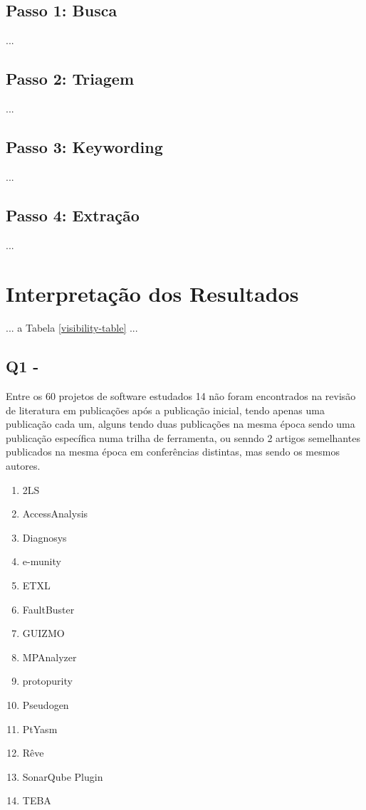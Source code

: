 \subsection{Passo 1: Busca}

...

\subsection{Passo 2: Triagem}

...

\subsection{Passo 3: Keywording}

...

\subsection{Passo 4: Extração}

...


\section{Interpretação dos Resultados} \label{estudo2:interpretacao} %

... a Tabela \ref{visibility-table} ...

%

\subsection{Q1 - \EstudoDoisQuestaoUm}



Entre os 60 projetos de software estudados 14 não foram encontrados na revisão
de literatura em publicações após a publicação inicial, tendo apenas uma
publicação cada um, alguns tendo duas publicações na mesma época sendo uma
publicação específica numa trilha de ferramenta, ou senndo 2 artigos
semelhantes publicados na mesma época em conferências distintas, mas sendo os
mesmos autores.

\begin{enumerate}
  \item 2LS
  \item AccessAnalysis
  \item Diagnosys
  \item e-munity
  \item ETXL
  \item FaultBuster
  \item GUIZMO
  \item MPAnalyzer
  \item protopurity
  \item Pseudogen
  \item PtYasm
  \item Rêve
  \item SonarQube Plugin
  \item TEBA
\end{enumerate}

